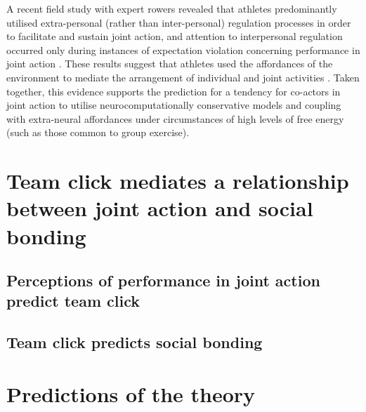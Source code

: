 \begin{CJK}{UTF8}{gbsn}
    A recent field study with expert rowers revealed that athletes predominantly utilised
    extra-personal (rather than inter-personal) regulation processes in order to facilitate and sustain joint action, and attention to interpersonal regulation occurred only during instances of expectation violation concerning performance in joint action \citep[; for a full explanation of this study, see Appendix ~\ref{app2:theory} Section ~\ref{sect:rowerStudy}]{RKiouak2016}. These results suggest that athletes used the affordances of the environment to mediate the arrangement of individual and joint activities \citep{Bourbousson2011,Bourbousson2012}.  Taken together, this evidence supports the prediction for a tendency for co-actors in joint action to utilise neurocomputationally conservative models and coupling with extra-neural affordances under circumstances of high levels of free energy (such as those common to group exercise).













\section{Team click mediates a relationship between joint action and social bonding}


    \subsection{Perceptions of performance in joint action predict team click}


    \subsection{Team click predicts social bonding}











\section{Predictions of the theory}



\end{CJK}
